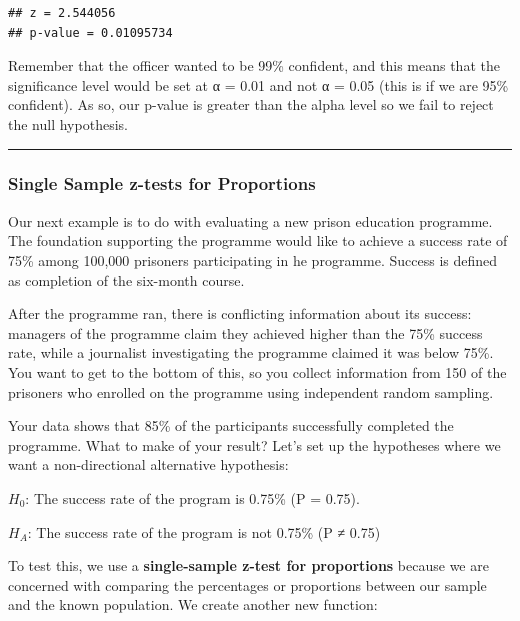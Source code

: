 \documentclass[
]{book}
\begin{document}
\begin{verbatim}
## z = 2.544056 
## p-value = 0.01095734
\end{verbatim}

Remember that the officer wanted to be 99\% confident, and this means that the significance level would be set at α = 0.01 and not α = 0.05 (this is if we are 95\% confident). As so, our p-value is greater than the alpha level so we fail to reject the null hypothesis.

\begin{center}\rule{0.5\linewidth}{0.5pt}\end{center}

\hypertarget{single-sample-z-tests-for-proportions}{%
\subsubsection{\texorpdfstring{\textbf{Single Sample z-tests for Proportions}}{Single Sample z-tests for Proportions}}\label{single-sample-z-tests-for-proportions}}

Our next example is to do with evaluating a new prison education programme. The foundation supporting the programme would like to achieve a success rate of 75\% among 100,000 prisoners participating in he programme. Success is defined as completion of the six-month course.

After the programme ran, there is conflicting information about its success: managers of the programme claim they achieved higher than the 75\% success rate, while a journalist investigating the programme claimed it was below 75\%. You want to get to the bottom of this, so you collect information from 150 of the prisoners who enrolled on the programme using independent random sampling.

Your data shows that 85\% of the participants successfully completed the programme. What to make of your result? Let's set up the hypotheses where we want a non-directional alternative hypothesis:

\(H_0\): The success rate of the program is 0.75\% (P = 0.75).

\(H_A\): The success rate of the program is not 0.75\% (P ≠ 0.75)

To test this, we use a \textbf{single-sample z-test for proportions} because we are concerned with comparing the percentages or proportions between our sample and the known population. We create another new function:
\end{document}
